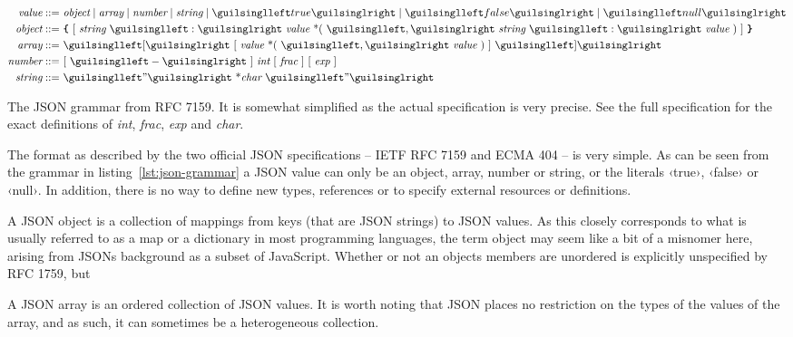 \begin{listing}[ht!]
\begin{align*}
\textit{value} ::=  &\ \textit{object} \mid \textit{array} \mid \textit{number} \mid \textit{string} \mid ‹true› \mid ‹false› \mid ‹null› \\
\textit{object} ::=  &\ \icode{\{}\ [\ \textit{string}\ ‹:›\ \textit{value}\ \text{*}(\ ‹,›\ \textit{string}\ ‹:›\ \textit{value}\ )\ ]\ \icode{\}} \\
\textit{array} ::= &\ ‹[›\ [\ \textit{value}\ \text{*}(\ ‹,›\ \textit{value}\ )\ ]\ ‹]› \\
\textit{number} ::= &\ [\ ‹-›\ ]\ \textit{int}\ [\ \textit{frac}\ ]\ [\ \textit{exp}\ ]\ \\
\textit{string} ::= &\ ‹"›\ \text{*}\textit{char}\ ‹"›
\end{align*}
\caption{The JSON grammar from RFC 7159. It is somewhat simplified as the actual specification is very precise. See the full specification for the exact definitions of \textit{int}, \textit{frac}, \textit{exp} and \textit{char}.}
\label{lst:json-grammar}
\end{listing}

The format as described by the two official JSON specifications -- IETF RFC 7159\cite{RFC7159} and ECMA 404\cite{ECMA404} -- is very simple. As can be seen from the grammar in listing~\ref{lst:json-grammar} a JSON value can only be an object, array, number or string, or the literals ‹true›, ‹false› or ‹null›. In addition, there is no way to define new types, references or to specify external resources or definitions.

A JSON object is a collection of mappings from keys (that are JSON strings) to JSON values. As this closely corresponds to what is usually referred to as a map or a dictionary in most programming languages, the term object may seem like a bit of a misnomer here, arising from JSONs background as a subset of JavaScript. Whether or not an objects members are unordered is explicitly unspecified by RFC 1759, but \cite[6]{RFC7159}

A JSON array is an ordered collection of JSON values. It is worth noting that JSON places no restriction on the types of the values of the array, and as such, it can sometimes be a heterogeneous collection.

